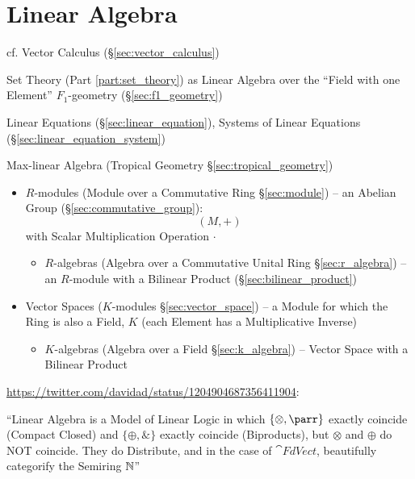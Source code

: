 \part{Linear Algebra}\label{part:linear_algebra}

\fist cf. Vector Calculus (\S\ref{sec:vector_calculus})

\fist Set Theory (Part \ref{part:set_theory}) as Linear Algebra over the
``Field with one Element'' \fist $F_1$-geometry (\S\ref{sec:f1_geometry})

\fist Linear Equations (\S\ref{sec:linear_equation}), Systems of Linear
Equations (\S\ref{sec:linear_equation_system})

\fist Max-linear Algebra (Tropical Geometry \S\ref{sec:tropical_geometry})

\begin{itemize}
  \item $R$-modules (Module over a Commutative Ring \S\ref{sec:module}) -- an
    Abelian Group (\S\ref{sec:commutative_group}):
    \[
      (M,+)
    \]
    with Scalar Multiplication Operation $\cdot$
    \begin{itemize}
      \item $R$-algebras (Algebra over a Commutative Unital Ring
        \S\ref{sec:r_algebra}) -- an $R$-module with a Bilinear Product
        (\S\ref{sec:bilinear_product})
    \end{itemize}
  \item Vector Spaces ($K$-modules \S\ref{sec:vector_space}) -- a Module for
    which the Ring is also a Field, $K$ (each Element has a Multiplicative
    Inverse)
    \begin{itemize}
      \item $K$-algebras (Algebra over a Field \S\ref{sec:k_algebra}) -- Vector
        Space with a Bilinear Product
    \end{itemize}
\end{itemize}

\asterism

\url{https://twitter.com/davidad/status/1204904687356411904}:

``Linear Algebra is a Model of Linear Logic in which $\{\otimes, \parr\}$
exactly coincide (Compact Closed) and $\{\oplus, \&\}$ exactly coincide
(Biproducts), but $\otimes$ and $\oplus$ do NOT coincide. They do Distribute,
and in the case of $\cat{FdVect}$, beautifully categorify the Semiring $\mathbb{N}$''



